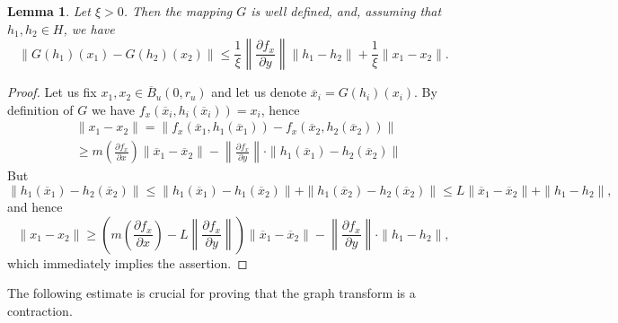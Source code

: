 \documentclass[11pt, leqno]{amsart}
\newtheorem{lem}[thm]{Lemma}
\theoremstyle{definition}
\begin{document}


\begin{lem}
\label{lem:G-estm}
Let $\xi>0$. Then the mapping $G$ is well defined, and, assuming that $h_1,h_2 \in H$, we have
  \begin{equation}
    \|G(h_1)(x_1) - G(h_2)(x_2)\| \leq      \frac{1}{\xi} \left\| \frac{\partial f_x}{\partial y}  \right\|  \|h_1 - h_2\| + \frac{1}{\xi}\|x_1-x_2\|.
  \end{equation}
\end{lem}
\begin{proof}
Let us fix $x_1, x_2 \in \overline{B}_u(0,r_u)$ and  let us denote $\overline{x}_i=G(h_i)(x_i)$.  By definition of $G$ we have $f_x(\overline{x}_i,h_i(\overline{x}_i))=x_i$, hence
\begin{align*}
  & \|x_1 - x_2\|= \|f_x(\overline{x}_1,h_1(\overline{x}_1)) - f_x(\overline{x}_2,h_2(\overline{x}_2))\|\\
   &\geq m\left(\frac{\partial f_x}{\partial x}\right) \|\overline{x}_1 - \overline{x}_2\| - \left\| \frac{\partial f_x}{\partial y}  \right\| \cdot \|h_1(\overline{x}_1) - h_2(\overline{x}_2)\|
\end{align*}
But
$$
	\|h_1(\overline{x}_1) - h_2(\overline{x}_2)\| \leq \|h_1(\overline{x}_1) - h_1(\overline{x}_2)\| +   \|h_1(\overline{x}_2) - h_2(\overline{x}_2)\| 
	\leq L \|\overline{x}_1-\overline{x}_2\| + \|h_1 - h_2\|,
$$
and hence
$$
\|x_1-x_2\| \geq \left(m\left(\frac{\partial f_x}{\partial x}\right) - L \left\| \frac{\partial f_x}{\partial y}\right\|\right)\|\overline{x}_1 - \overline{x}_2\| - \left\| \frac{\partial f_x}{\partial y}  \right\| \cdot \|h_1 - h_2\|,
$$
which immediately implies the assertion. 
\end{proof}





The following estimate is crucial for proving that the graph transform is a contraction.
\end{document}
